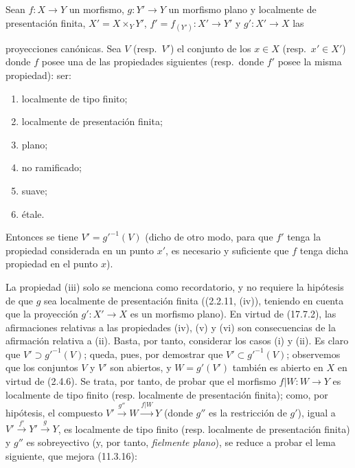 \begin{proposition}[17.7.4]
\label{IV.17.7.4}
Sean $f:X\to Y$ un morfismo, $g:Y'\to Y$ un morfismo plano y localmente de presentación finita, $X'=X\times_Y Y'$, $f'=f_{(Y')}:X'\to Y'$ y $g':X'\to X$ las


proyecciones canónicas. Sea $V$ \textup{(resp.}\ $V'$\textup{)} el conjunto de los $x\in X$ \textup{(resp.}\ $x'\in X'$\textup{)} donde $f$ posee una de las propiedades siguientes \textup{(resp.}\ donde $f'$ posee la misma propiedad\textup{)}: ser:
\begin{enumerate}
  \item[\textup{(i)}] localmente de tipo finito;
  \item[\textup{(ii)}] localmente de presentación finita;
  \item[\textup{(iii)}] plano;
  \item[\textup{(iv)}] no ramificado;
  \item[\textup{(v)}] suave;
  \item[\textup{(vi)}] étale.
\end{enumerate}
Entonces se tiene $V'=g'^{-1}(V)$ \textup{(dicho de otro modo, para que $f'$ tenga la propiedad considerada en un punto $x'$, es necesario y suficiente que $f$ tenga dicha propiedad en el punto $x$)}.
\end{proposition}

La propiedad (iii) solo se menciona como recordatorio, y no requiere la hipótesis de que $g$ sea localmente de presentación finita ((2.2.11, (iv)), teniendo en cuenta que la proyección $g':X'\to X$ es un morfismo plano). En virtud de (17.7.2), las afirmaciones relativas a las propiedades (iv), (v) y (vi) son consecuencias de la afirmación relativa a (ii). Basta, por tanto, considerar los casos (i) y (ii). Es claro que $V'\supset g'^{-1}(V)$; queda, pues, por demostrar que $V'\subset g'^{-1}(V)$; observemos que los conjuntos $V$ y $V'$ son abiertos, y $W=g'(V')$ también es abierto en $X$ en virtud de (2.4.6). Se trata, por tanto, de probar que el morfismo $f|W:W\to Y$ es localmente de tipo finito (resp. localmente de presentación finita); como, por hipótesis, el compuesto
$V'\xrightarrow{g''}W\xrightarrow{f|W}Y$
(donde $g''$ es la restricción de $g'$), igual a $V'\xrightarrow{f'}Y'\xrightarrow{g}Y$, es localmente de tipo finito (resp. localmente de presentación finita) y $g''$ es sobreyectivo (y, por tanto, \emph{fielmente plano}), se reduce a probar el lema siguiente, que mejora (11.3.16):

